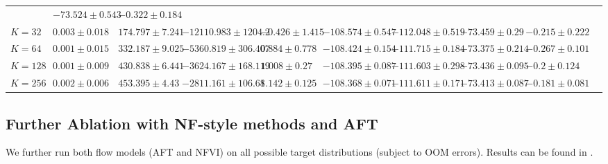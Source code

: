 \begin{table}[htb!]
\begin{center}
\begin{small}
\begin{sc}
{\begin{tabular}{lcccccccccc}
& $-73.524 \pm 0.543$ 
& $-0.322 \pm 0.184$ 
    \\
    $K=32$
& $0.003 \pm 0.018$ 
& $174.797 \pm 7.241$ 
& $-12110.983 \pm 1204.2$ 
& $-0.426 \pm 1.415$ 
& $-108.574 \pm 0.547$ 
& $-112.048 \pm 0.519$ 
& $-73.459 \pm 0.29$ 
& $-0.215 \pm 0.222$ 
    \\
    $K=64$
& $0.001 \pm 0.015$ 
& $332.187 \pm 9.025$ 
& $-5360.819 \pm 306.407$ 
& $0.884 \pm 0.778$ 
& $-108.424 \pm 0.154$ 
& $-111.715 \pm 0.184$ 
& $-73.375 \pm 0.214$ 
& $-0.267 \pm 0.101$ 
    \\
    $K=128$
& $0.001 \pm 0.009$ 
& $430.838 \pm 6.441$ 
& $-3624.167 \pm 168.119$ 
& $1.008 \pm 0.27$ 
& $-108.395 \pm 0.087$ 
& $-111.603 \pm 0.298$ 
& $-73.436 \pm 0.095$ 
& $-0.2 \pm 0.124$ 
    \\
    $K=256$
& $0.002 \pm 0.006$ 
& $453.395 \pm 4.43$
& $-2811.161 \pm 106.68$ 
& $1.142 \pm 0.125$ 
& $-108.368 \pm 0.071$ 
& $-111.611 \pm 0.171$ 
& $-73.413 \pm 0.087$ 
& $-0.181 \pm 0.081$ 
    \\
    \bottomrule
  \end{tabular}
 }
\end{sc}
\end{small}
\end{center}
\vskip -0.1in
\end{table}

\subsection{Further Ablation with NF-style methods and AFT}

We further run both flow models (AFT and NFVI) on all possible target distributions (subject to OOM errors). Results can be found in .

